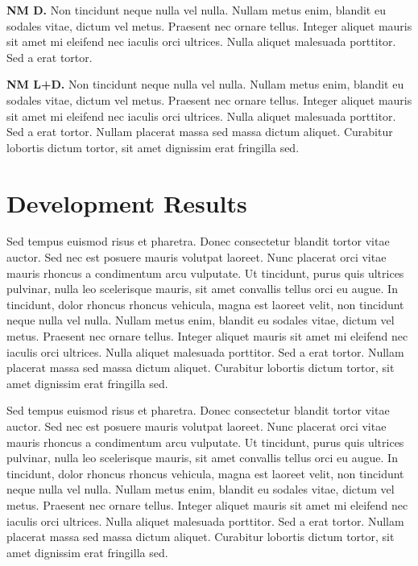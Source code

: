 \documentclass[11pt,letterpaper]{article}
\begin{document}
\textbf{NM D.} Non tincidunt neque nulla vel nulla. Nullam metus enim, blandit eu sodales vitae, dictum vel metus. Praesent nec ornare tellus. Integer aliquet mauris sit amet mi eleifend nec iaculis orci ultrices. Nulla aliquet malesuada porttitor. Sed a erat tortor.

\textbf{NM L+D.} Non tincidunt neque nulla vel nulla. Nullam metus enim, blandit eu sodales vitae, dictum vel metus. Praesent nec ornare tellus. Integer aliquet mauris sit amet mi eleifend nec iaculis orci ultrices. Nulla aliquet malesuada porttitor. Sed a erat tortor. Nullam placerat massa sed massa dictum aliquet. Curabitur lobortis dictum tortor, sit amet dignissim erat fringilla sed.


\section{Development Results}
\label{sec:results}

Sed tempus euismod risus et pharetra. Donec consectetur blandit tortor vitae auctor. Sed nec est posuere mauris volutpat laoreet. Nunc placerat orci vitae mauris rhoncus a condimentum arcu vulputate. Ut tincidunt, purus quis ultrices pulvinar, nulla leo scelerisque mauris, sit amet convallis tellus orci eu augue. In tincidunt, dolor rhoncus rhoncus vehicula, magna est laoreet velit, non tincidunt neque nulla vel nulla. Nullam metus enim, blandit eu sodales vitae, dictum vel metus. Praesent nec ornare tellus. Integer aliquet mauris sit amet mi eleifend nec iaculis orci ultrices. Nulla aliquet malesuada porttitor. Sed a erat tortor. Nullam placerat massa sed massa dictum aliquet. Curabitur lobortis dictum tortor, sit amet dignissim erat fringilla sed.

Sed tempus euismod risus et pharetra. Donec consectetur blandit tortor vitae auctor. Sed nec est posuere mauris volutpat laoreet. Nunc placerat orci vitae mauris rhoncus a condimentum arcu vulputate. Ut tincidunt, purus quis ultrices pulvinar, nulla leo scelerisque mauris, sit amet convallis tellus orci eu augue. In tincidunt, dolor rhoncus rhoncus vehicula, magna est laoreet velit, non tincidunt neque nulla vel nulla. Nullam metus enim, blandit eu sodales vitae, dictum vel metus. Praesent nec ornare tellus. Integer aliquet mauris sit amet mi eleifend nec iaculis orci ultrices. Nulla aliquet malesuada porttitor. Sed a erat tortor. Nullam placerat massa sed massa dictum aliquet. Curabitur lobortis dictum tortor, sit amet dignissim erat fringilla sed.
\end{document}
